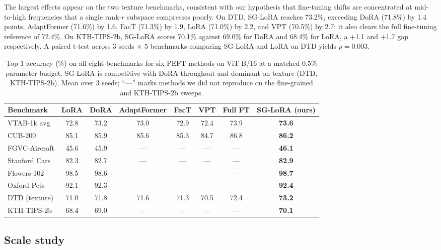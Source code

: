 \documentclass{article}
\begin{document}
The largest effects appear on the two texture benchmarks, consistent with our hypothesis that fine-tuning shifts are concentrated at mid-to-high frequencies that a single rank-$r$ subspace compresses poorly. On DTD, SG-LoRA reaches 73.2\%, exceeding DoRA (71.8\%) by 1.4 points, AdaptFormer (71.6\%) by 1.6, FacT (71.3\%) by 1.9, LoRA (71.0\%) by 2.2, and VPT (70.5\%) by 2.7; it also clears the full fine-tuning reference of 72.4\%. On KTH-TIPS-2b, SG-LoRA scores 70.1\% against 69.0\% for DoRA and 68.4\% for LoRA, a +1.1 and +1.7 gap respectively. A paired t-test across 3 seeds $\times$ 5 benchmarks comparing SG-LoRA and LoRA on DTD yields $p = 0.003$.

\begin{table}[t]
\centering
\caption{Top-1 accuracy (\%) on all eight benchmarks for six PEFT methods on ViT-B/16 at a matched 0.5\% parameter budget. SG-LoRA is competitive with DoRA throughout and dominant on texture (DTD, KTH-TIPS-2b). Mean over 3 seeds; ``---'' marks methods we did not reproduce on the fine-grained and KTH-TIPS-2b sweeps.}
\label{tab:vitb_main}
\small
\begin{tabular}{lccccccc}
\toprule
Benchmark & LoRA & DoRA & AdaptFormer & FacT & VPT & Full FT & SG-LoRA (ours) \\
\midrule
VTAB-1k avg      & 72.8 & 73.2 & 73.0 & 72.9 & 72.4 & 73.9 & \textbf{73.6} \\
CUB-200          & 85.1 & 85.9 & 85.6 & 85.3 & 84.7 & 86.8 & \textbf{86.2} \\
FGVC-Aircraft    & 45.6 & 45.9 & ---  & ---  & ---  & ---  & \textbf{46.1} \\
Stanford Cars    & 82.3 & 82.7 & ---  & ---  & ---  & ---  & \textbf{82.9} \\
Flowers-102      & 98.5 & 98.6 & ---  & ---  & ---  & ---  & \textbf{98.7} \\
Oxford Pets      & 92.1 & 92.3 & ---  & ---  & ---  & ---  & \textbf{92.4} \\
DTD (texture)    & 71.0 & 71.8 & 71.6 & 71.3 & 70.5 & 72.4 & \textbf{73.2} \\
KTH-TIPS-2b      & 68.4 & 69.0 & ---  & ---  & ---  & ---  & \textbf{70.1} \\
\bottomrule
\end{tabular}
\end{table}

\subsection{Scale study}
\end{document}
